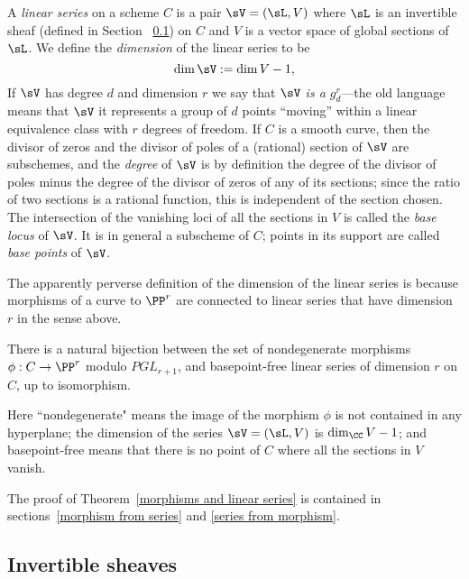\begin{definition}
 A \emph{linear series} on a scheme $C$ is a pair $\sV  = (\sL, V)$ where $\sL$ is an invertible sheaf (defined in Section ~\ref{Invertible sheaves}) on $C$ and
 $V$ is a vector space of global sections of $\sL$. We define the \emph{dimension} of the linear series to be 
 $$
 \dim \sV := \dim V -1,
 $$
If $\sV$ has degree $d$ and dimension $r$ we say that \emph{$\sV$ is a $g^r_d$}---the old language means that $\sV$ it represents a group of $d$ points ``moving'' within a linear equivalence class with $r$ degrees of freedom. If $C$ is a smooth curve, then the divisor of zeros and the divisor of poles of a (rational) section of $\sV$ are subschemes, and the \emph{degree} of $\sV$ is by definition the degree of the divisor of poles minus the degree of the divisor of zeros of any of its sections; since the 
 ratio of two sections is a rational function, this is independent of the section chosen. The intersection of the vanishing loci of all the sections in $V$ is called the \emph{base locus} of $\sV$. It is in general a subscheme of $C$; points in its support are called \emph{base points} of $\sV$. \end{definition}

The apparently perverse definition of the dimension of the linear series is because morphisms of a curve to $\PP^r$ are connected to linear series that have dimension $r$ in the sense above.

\begin{theorem}\label{morphisms and linear series}
There is a natural bijection between the set of nondegenerate morphisms $\phi : C \to \PP^r$ modulo $PGL_{r+1}$, and basepoint-free linear series of dimension $r$ on $C$, up to isomorphism.\end{theorem}

Here ``nondegenerate" means the image of the morphism $\phi$ is not contained in any hyperplane; the dimension of the series
 $\sV  = (\sL, V)$ is $\dim_\CC V -1$; and basepoint-free means that there is no point of $C$ where all the sections in $V$
vanish.

The proof of Theorem~\ref{morphisms and linear series} is contained in sections~\ref{morphism from series}
and \ref{series from morphism}.


\subsection{Invertible sheaves}\label{Invertible sheaves}

